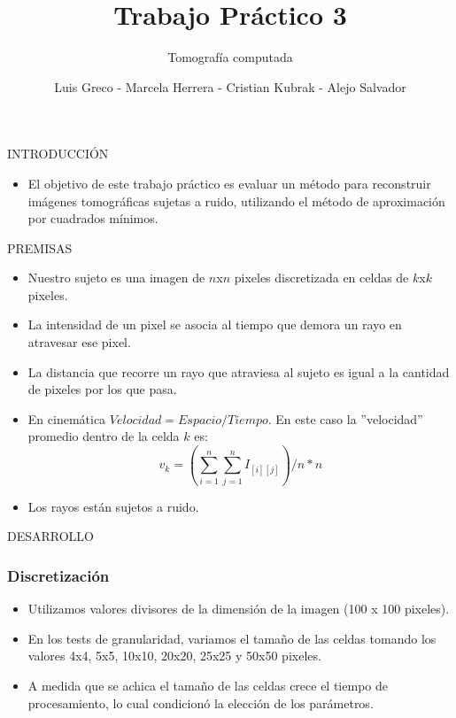\documentclass[11pt]{beamer}
\author{Luis Greco - Marcela Herrera - Cristian Kubrak - Alejo Salvador }
\title{Trabajo Práctico 3}
\subtitle{Tomografía computada}
\begin{document}
\begin{frame}
\titlepage 
\end{frame}


\begin{frame}{INTRODUCCIÓN}
\begin{itemize}
\item El objetivo de este trabajo práctico es evaluar un método para reconstruir imágenes tomográficas sujetas a ruido, utilizando el método de aproximación por cuadrados mínimos.
\end{itemize}
\end{frame}

\begin{frame}{PREMISAS}
\begin{itemize}
\item Nuestro sujeto es una imagen de $n$x$n$ pixeles discretizada en celdas de $k$x$k$ pixeles.
\item La intensidad de un pixel se asocia al tiempo que demora un rayo en atravesar ese pixel.
\item La distancia que recorre un rayo que atraviesa al sujeto es igual a la cantidad de pixeles por los que pasa.
\item En cinemática $Velocidad = Espacio/Tiempo$. En este caso la ''velocidad'' promedio dentro de la celda $k$ es:
\begin{displaymath}
v_{k} =(\sum_{i=1}^{n}\sum_{j=1}^{n} I_{[i][j]})/n*n
\end{displaymath}
\item Los rayos están sujetos a ruido.
\end{itemize}
\end{frame}


\begin{frame}{DESARROLLO}
\frametitle {Discretización}
\begin{itemize}
\item Utilizamos valores divisores de la dimensión de la imagen (100 x 100 pixeles).
\item En los tests de granularidad, variamos el tamaño de las celdas tomando los valores 4x4, 5x5, 10x10, 20x20, 25x25 y 50x50 pixeles.
\item A medida que se achica el tamaño de las celdas crece el tiempo de procesamiento, lo cual condicionó la elección de los parámetros.
\end{itemize}
\end{frame}
\end{document}
